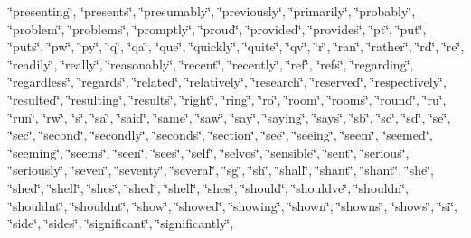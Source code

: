 \char`\"{}presenting\char`\"{}, \char`\"{}presents\char`\"{}, \char`\"{}presumably\char`\"{}, \char`\"{}previously\char`\"{}, \char`\"{}primarily\char`\"{}, \char`\"{}probably\char`\"{}, \char`\"{}problem\char`\"{}, \char`\"{}problems\char`\"{}, \char`\"{}promptly\char`\"{}, \char`\"{}proud\char`\"{}, \char`\"{}provided\char`\"{}, \char`\"{}provides\char`\"{}, \char`\"{}pt\char`\"{}, \char`\"{}put\char`\"{}, \char`\"{}puts\char`\"{}, \char`\"{}pw\char`\"{}, \char`\"{}py\char`\"{}, \char`\"{}q\char`\"{}, \char`\"{}qa\char`\"{}, \char`\"{}que\char`\"{}, \char`\"{}quickly\char`\"{}, \char`\"{}quite\char`\"{}, \char`\"{}qv\char`\"{}, \char`\"{}r\char`\"{}, \char`\"{}ran\char`\"{}, \char`\"{}rather\char`\"{}, \char`\"{}rd\char`\"{}, \char`\"{}re\char`\"{}, \char`\"{}readily\char`\"{}, \char`\"{}really\char`\"{}, \char`\"{}reasonably\char`\"{}, \char`\"{}recent\char`\"{}, \char`\"{}recently\char`\"{}, \char`\"{}ref\char`\"{}, \char`\"{}refs\char`\"{}, \char`\"{}regarding\char`\"{}, \char`\"{}regardless\char`\"{}, \char`\"{}regards\char`\"{}, \char`\"{}related\char`\"{}, \char`\"{}relatively\char`\"{}, \char`\"{}research\char`\"{}, \char`\"{}reserved\char`\"{}, \char`\"{}respectively\char`\"{}, \char`\"{}resulted\char`\"{}, \char`\"{}resulting\char`\"{}, \char`\"{}results\char`\"{}, \char`\"{}right\char`\"{}, \char`\"{}ring\char`\"{}, \char`\"{}ro\char`\"{}, \char`\"{}room\char`\"{}, \char`\"{}rooms\char`\"{}, \char`\"{}round\char`\"{}, \char`\"{}ru\char`\"{}, \char`\"{}run\char`\"{}, \char`\"{}rw\char`\"{}, \char`\"{}s\char`\"{}, \char`\"{}sa\char`\"{}, \char`\"{}said\char`\"{}, \char`\"{}same\char`\"{}, \char`\"{}saw\char`\"{}, \char`\"{}say\char`\"{}, \char`\"{}saying\char`\"{}, \char`\"{}says\char`\"{}, \char`\"{}sb\char`\"{}, \char`\"{}sc\char`\"{}, \char`\"{}sd\char`\"{}, \char`\"{}se\char`\"{}, \char`\"{}sec\char`\"{}, \char`\"{}second\char`\"{}, \char`\"{}secondly\char`\"{}, \char`\"{}seconds\char`\"{}, \char`\"{}section\char`\"{}, \char`\"{}see\char`\"{}, \char`\"{}seeing\char`\"{}, \char`\"{}seem\char`\"{}, \char`\"{}seemed\char`\"{}, \char`\"{}seeming\char`\"{}, \char`\"{}seems\char`\"{}, \char`\"{}seen\char`\"{}, \char`\"{}sees\char`\"{}, \char`\"{}self\char`\"{}, \char`\"{}selves\char`\"{}, \char`\"{}sensible\char`\"{}, \char`\"{}sent\char`\"{}, \char`\"{}serious\char`\"{}, \char`\"{}seriously\char`\"{}, \char`\"{}seven\char`\"{}, \char`\"{}seventy\char`\"{}, \char`\"{}several\char`\"{}, \char`\"{}sg\char`\"{}, \char`\"{}sh\char`\"{}, \char`\"{}shall\char`\"{}, \char`\"{}shan\textquotesingle{}t\char`\"{}, \char`\"{}shant\char`\"{}, \char`\"{}she\char`\"{}, \char`\"{}she\textquotesingle{}d\char`\"{}, \char`\"{}she\textquotesingle{}ll\char`\"{}, \char`\"{}she\textquotesingle{}s\char`\"{}, \char`\"{}shed\char`\"{}, \char`\"{}shell\char`\"{}, \char`\"{}shes\char`\"{}, \char`\"{}should\char`\"{}, \char`\"{}should\textquotesingle{}ve\char`\"{}, \char`\"{}shouldn\char`\"{}, \char`\"{}shouldn\textquotesingle{}t\char`\"{}, \char`\"{}shouldnt\char`\"{}, \char`\"{}show\char`\"{}, \char`\"{}showed\char`\"{}, \char`\"{}showing\char`\"{}, \char`\"{}shown\char`\"{}, \char`\"{}showns\char`\"{}, \char`\"{}shows\char`\"{}, \char`\"{}si\char`\"{}, \char`\"{}side\char`\"{}, \char`\"{}sides\char`\"{}, \char`\"{}significant\char`\"{}, \char`\"{}significantly\char`\"{}, 
